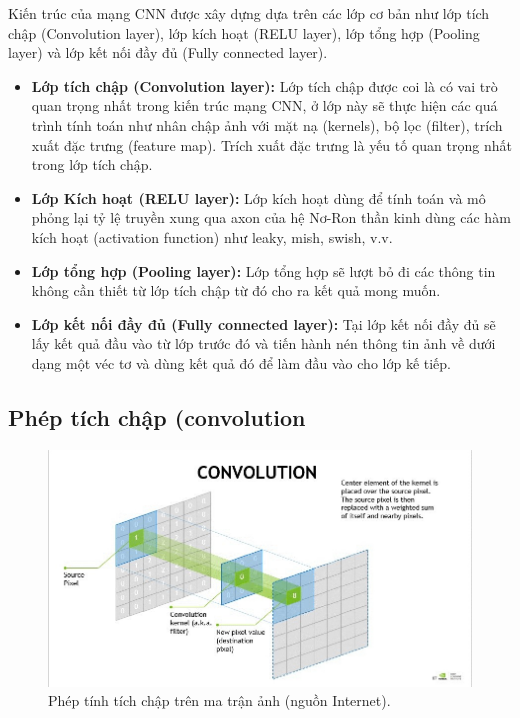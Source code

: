 Kiến trúc của mạng CNN được xây dựng dựa trên các lớp cơ bản như lớp tích chập (Convolution layer), lớp kích hoạt (RELU layer), lớp tổng hợp (Pooling layer) và lớp kết nối đầy đủ (Fully connected layer).

\begin{itemize}
    \item \textbf{Lớp tích chập (Convolution layer):} Lớp tích chập được coi là có vai trò quan trọng nhất trong kiến trúc mạng CNN, ở lớp này sẽ thực hiện các quá trình tính toán như nhân chập ảnh với mặt nạ (kernels), bộ lọc (filter), trích xuất đặc trưng (feature map). Trích xuất đặc trưng là yếu tố quan trọng nhất trong lớp tích chập.

    \item \textbf{Lớp Kích hoạt (RELU layer):} Lớp kích hoạt dùng để tính toán và mô phỏng lại tỷ lệ truyền xung qua axon của hệ Nơ-Ron thần kinh dùng các hàm kích hoạt (activation function) như leaky, mish, swish, v.v.

    \item \textbf{Lớp tổng hợp (Pooling layer):} Lớp tổng hợp sẽ lượt bỏ đi các thông tin không cần thiết từ lớp tích chập từ đó cho ra kết quả mong muốn.

    \item \textbf{Lớp kết nối đầy đủ (Fully connected layer):} Tại lớp kết nối đầy đủ sẽ lấy kết quả đầu vào từ lớp trước đó và tiến hành nén thông tin ảnh về dưới dạng một véc tơ và dùng kết quả đó để làm đầu vào cho lớp kế tiếp.
    
\end{itemize}

\subsection{Phép tích chập (convolution}

\begin{figure}[h]
	\centering
	\includegraphics[width=120mm]{fig/eqconvolution.jpg}
        \captionsetup{justification=centering}
	\caption{Phép tính tích chập trên ma trận ảnh (nguồn Internet).}
	\label{fig_eqconvolution}
\end{figure}

